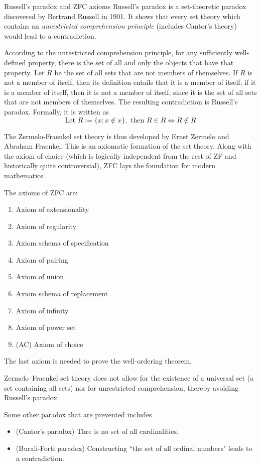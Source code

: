 \documentclass[11pt]{article}
\begin{document}
\begin{extension}{Russell's paradox and ZFC axioms}
  Russell's paradox is a set-theoretic paradox discovered by Bertrand Russell in 1901. It shows that every set theory which contains an \emph{unrestricted comprehension principle} (includes Cantor's theory) would lead to a contradiction.

  \vspace{5pt}According to the unrestricted comprehension principle, for any sufficiently well-defined property, there is the set of all and only the objects that have that property. Let \(R\) be the set of all sets that are not members of themselves. If \(R\) is not a member of itself, then its definition entails that it is a member of itself; if it is a member of itself, then it is not a member of itself, since it is the set of all sets that are not members of themselves. The resulting contradiction is Russell's paradox. Formally, it is written as
  \[\text{Let } R:=\{x:x\notin x\},\text{ then } R \in R \iff R \notin R\]

  The Zermelo-Fraenkel set theory is thus developed by Ernst Zermelo and Abraham Fraenkel. This is an axiomatic formation of the set theory. Along with the axiom of choice (which is logically independent from the rest of ZF and historically quite controversial), ZFC lays the foundation for modern mathematics. 
  
  \vspace{5pt}The axioms of ZFC are:
  \begin{enumerate}
    \item Axiom of extensionality
    \item Axiom of regularity
    \item Axiom schema of specification
    \item Axiom of pairing
    \item Axiom of union
    \item Axiom schema of replacement
    \item Axiom of infinity
    \item Axiom of power set
    \item (AC) Axiom of choice
  \end{enumerate}
  The last axiom is needed to prove the well-ordering theorem. 

  \vspace{5pt}Zermelo–Fraenkel set theory does not allow for the existence of a universal set (a set containing all sets) nor for unrestricted comprehension, thereby avoiding Russell's paradox.

  \vspace{5pt}Some other paradox that are prevented includes
  \begin{itemize}
    \item (Cantor's paradox) Thre is no set of all cardinalities.
    \item (Burali-Forti paradox) Constructing ``the set of all ordinal numbers" leads to a contradiction.
  \end{itemize}
\end{extension}
\end{document}

